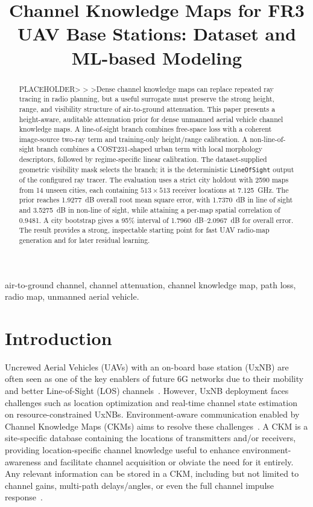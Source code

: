 \documentclass[10pt,conference,letterpaper]{IEEEtran}
\title{Channel Knowledge Maps for FR3 UAV Base Stations: Dataset and ML-based Modeling}
\author{\IEEEauthorblockN{Guillem Moreno Garcia, Sergi Abadal, Evgenii Vinogradov}
\IEEEauthorblockA{Universitat Polit\`ecnica de Catalunya (UPC), Barcelona, Spain\\
guillem.moreno.garcia@estudiantat.upc.edu}}
\begin{document}
\maketitle

\begin{abstract}
PLACEHOLDER> > >Dense channel knowledge maps can replace repeated ray tracing in radio
planning, but a useful surrogate must preserve the strong height, range, and
visibility structure of air-to-ground attenuation. This paper presents a
height-aware, auditable attenuation prior for dense unmanned aerial vehicle
channel knowledge maps. A line-of-sight branch combines free-space loss with a
coherent image-source two-ray term and training-only height/range calibration.
A non-line-of-sight branch combines a COST231-shaped urban term with local
morphology descriptors, followed by regime-specific linear
calibration. The dataset-supplied geometric visibility mask selects the branch;
it is the deterministic \texttt{LineOfSight} output of the configured ray
tracer. The
evaluation uses a strict city holdout with 2590 maps from 14 unseen cities,
each containing $513\times513$ receiver locations at \SI{7.125}{GHz}. The
prior reaches \SI{1.9277}{dB} overall root mean square error, with
\SI{1.7370}{dB} in line of sight and \SI{3.5275}{dB} in non-line of sight,
while attaining a per-map spatial correlation of 0.9481. A city bootstrap
gives a 95\% interval of \SIrange{1.7960}{2.0967}{dB} for overall error. The
result provides a
strong, inspectable starting point for fast UAV radio-map generation and for
later residual learning.
\end{abstract}

\begin{IEEEkeywords}
air-to-ground channel, channel attenuation, channel knowledge map, path loss,
radio map, unmanned aerial vehicle.
\end{IEEEkeywords}

\section{Introduction}
Uncrewed Aerial Vehicles (UAVs) with an on-board base station (UxNB) are often seen as one of the key enablers of future 6G networks due to their mobility and better Line-of-Sight (LOS) channels~\cite{Vinogradov2018,Geraci2022ntn}. However, UxNB deployment faces challenges such as location optimization and real-time channel state estimation on resource-constrained UxNBs. Environment-aware communication enabled by Channel Knowledge Maps (CKMs) aims to resolve these challenges~\cite{ckmtutorial2024}. A CKM is a site-specific database containing the locations of transmitters and/or receivers, providing location-specific channel knowledge useful to enhance environment-awareness and facilitate channel acquisition or obviate the need for it entirely. Any relevant information can be stored in a CKM, including but not limited to channel gains, multi-path delays/angles, or even the full channel impulse response~\cite{zengx2021ckm}.
\end{document}
